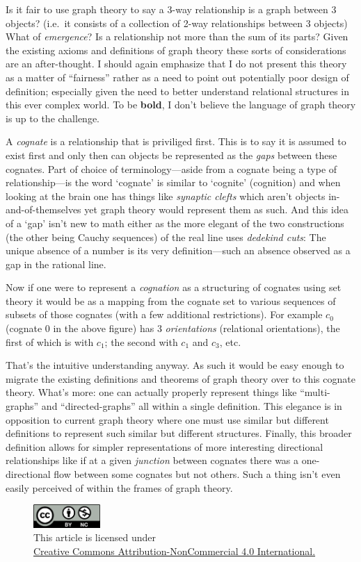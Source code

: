 \documentclass[twoside]{article}
\begin{document}
Is it fair to use graph theory to say a 3-way relationship is a graph between 3 objects?  (i.e.~it consists of a collection
of 2-way relationships between 3 objects) What of \emph{emergence}? Is a relationship not more than the sum of its parts?
Given the existing axioms and definitions of graph theory these sorts of considerations are an after-thought. I should
again emphasize that I do not present this theory as a matter of ``fairness'' rather as a need to point out potentially
poor design of definition; especially given the need to better understand relational structures in this ever complex world.
To be {\bfseries bold}, I don't believe the language of graph theory is up to the challenge.

A \emph{cognate} is a relationship that is priviliged first. This is to say it is assumed to exist first and only
then can objects be represented as the \emph{gaps} between these cognates. Part of choice of terminology---aside from
a cognate being a type of relationship---is the word `cognate' is similar to `cognite' (cognition) and when looking
at the brain one has things like \emph{synaptic clefts} which aren't objects in-and-of-themselves yet graph theory
would represent them as such. And this idea of a `gap' isn't new to math either as the more elegant of the two constructions
(the other being Cauchy sequences) of the real line uses \emph{dedekind cuts}: The unique absence of a number is its very
definition---such an absence observed as a gap in the rational line.

Now if one were to represent a \emph{cognation} as a structuring of cognates using set theory it would be as a mapping from
the cognate set to various sequences of subsets of those cognates (with a few additional restrictions). For example $ c_0 $
(cognate $ 0 $ in the above figure) has 3 \emph{orientations} (relational orientations), the first of which is with $ c_1 $;
the second with $ c_1 $ and $ c_3 $, etc.

That's the intuitive understanding anyway. As such it would be easy enough to migrate the existing definitions and theorems of graph
theory over to this cognate theory. What's more: one can actually properly represent things like ``multi-graphs'' and ``directed-graphs''
all within a single definition. This elegance is in opposition to current graph theory where one must use similar but different
definitions to represent such similar but different structures. Finally, this broader definition allows for simpler representations
of more interesting directional relationships like if at a given \emph{junction} between cognates there was a one-directional
flow between some cognates but not others. Such a thing isn't even easily perceived of within the frames of graph theory.

\begin{figure}[h]
\centering
\includegraphics[width=1in]{../../../cc-by-nc.png}\\[0.1in]
\tiny This article is licensed under \\
\href{http://creativecommons.org/licenses/by-nc/4.0/}
{Creative Commons Attribution-NonCommercial 4.0 International.}\\[0.3in]
\end{figure}
\end{document}
